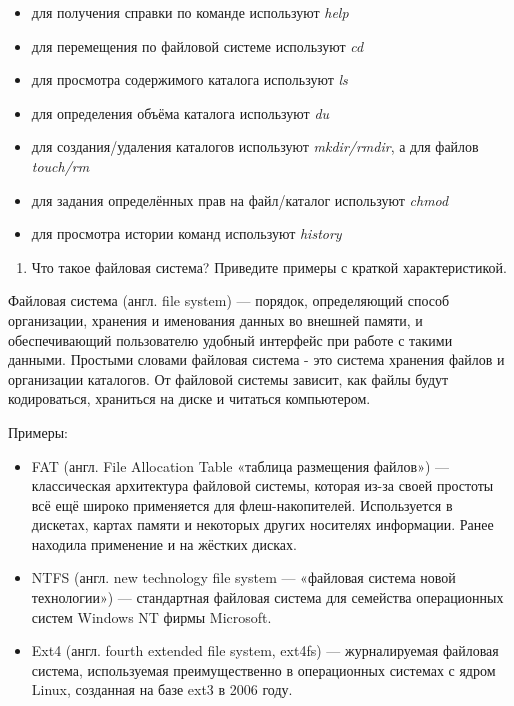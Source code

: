 \documentclass[
  english,
  russian,
  12pt,
  a4paper,
  DIV=11,
  numbers=noendperiod]{scrreprt}
\providecommand{\tightlist}{%
  \setlength{\itemsep}{0pt}\setlength{\parskip}{0pt}}
\begin{document}
\begin{itemize}
\item
  для получения справки по команде используют \emph{help}
\item
  для перемещения по файловой системе используют \emph{cd}
\item
  для просмотра содержимого каталога используют \emph{ls}
\item
  для определения объёма каталога используют \emph{du}
\item
  для создания/удаления каталогов используют \emph{mkdir/rmdir}, а для
  файлов \emph{touch/rm}
\item
  для задания определённых прав на файл/каталог используют \emph{chmod}
\item
  для просмотра истории команд используют \emph{history}
\end{itemize}

\begin{enumerate}
\def\labelenumi{\arabic{enumi}.}
\setcounter{enumi}{2}
\tightlist
\item
  Что такое файловая система? Приведите примеры с краткой
  характеристикой.
\end{enumerate}

Файловая система (англ. file system) --- порядок, определяющий способ
организации, хранения и именования данных во внешней памяти, и
обеспечивающий пользователю удобный интерфейс при работе с такими
данными. Простыми словами файловая система - это система хранения файлов
и организации каталогов. От файловой системы зависит, как файлы будут
кодироваться, храниться на диске и читаться компьютером.

Примеры:

\begin{itemize}
\item
  FAT (англ. File Allocation Table «таблица размещения файлов») ---
  классическая архитектура файловой системы, которая из-за своей
  простоты всё ещё широко применяется для флеш-накопителей. Используется
  в дискетах, картах памяти и некоторых других носителях информации.
  Ранее находила применение и на жёстких дисках.
\item
  NTFS (англ. new technology file system --- «файловая система новой
  технологии») --- стандартная файловая система для семейства
  операционных систем Windows NT фирмы Microsoft.
\item
  Ext4 (англ. fourth extended file system, ext4fs) --- журналируемая
  файловая система, используемая преимущественно в операционных системах
  с ядром Linux, созданная на базе ext3 в 2006 году.
\end{itemize}
\end{document}
